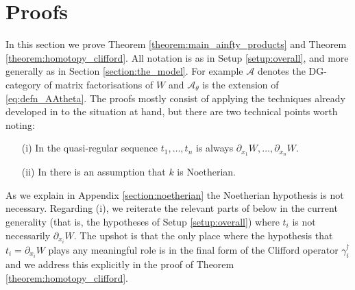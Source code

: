 \documentclass[english,letter paper,12pt,leqno]{article}
\theoremstyle{example}
\numberwithin{equation}{section}
\def\AA{\mathcal{A}}
\begin{document}
\section{Proofs}\label{section:proofs}

In this section we prove Theorem \ref{theorem:main_ainfty_products} and Theorem \ref{theorem:homotopy_clifford}. All notation is as in Setup \ref{setup:overall}, and more generally as in Section \ref{section:the_model}. For example $\AA$ denotes the DG-category of matrix factorisations of $W$ and $\AA_{\theta}$ is the extension of \eqref{eq:defn_AAtheta}. The proofs mostly consist of applying the techniques already developed in \cite{pushforward, cut} to the situation at hand, but there are two technical points worth noting:
\begin{itemize}
\item[(i)] In \cite{cut} the quasi-regular sequence $t_1,\ldots,t_n$ is always $\partial_{x_1} W, \ldots, \partial_{x_n} W$.
\item[(ii)] In \cite{cut} there is an assumption that $k$ is Noetherian.
\end{itemize}
As we explain in Appendix \ref{section:noetherian} the Noetherian hypothesis is not necessary. Regarding (i), we reiterate the relevant parts of \cite{cut} below in the current generality (that is, the hypotheses of Setup \ref{setup:overall}) where $t_i$ is not necessarily $\partial_{x_i} W$. The upshot is that the only place where the hypothesis that $t_i = \partial_{x_i} W$ plays any meaningful role is in the final form of the Clifford operator $\gamma_i^\dagger$ and we address this explicitly in the proof of Theorem \ref{theorem:homotopy_clifford}.
\end{document}
